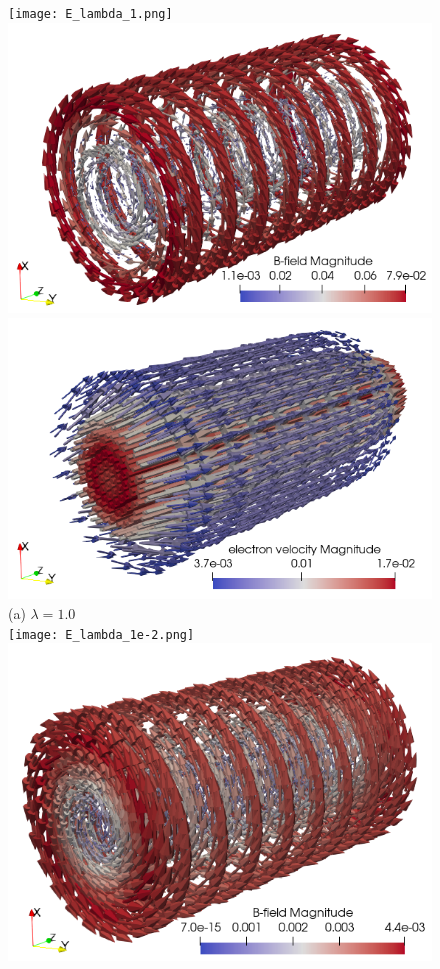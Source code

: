 \documentclass{report}
\begin{document}
\begin{figure}
    \centering
    \texttt{[image: E\_lambda\_1.png]}
    \includegraphics[scale=0.35]{B_lambda_1.png}
    \includegraphics[scale=0.35]{ue_lambda_1.png} \\
    (a) $\lambda = 1.0$ \\
    \texttt{[image: E\_lambda\_1e-2.png]}
    \includegraphics[scale=0.35]{B_lambda_1e-2.png}

\end{figure}
\end{document}
